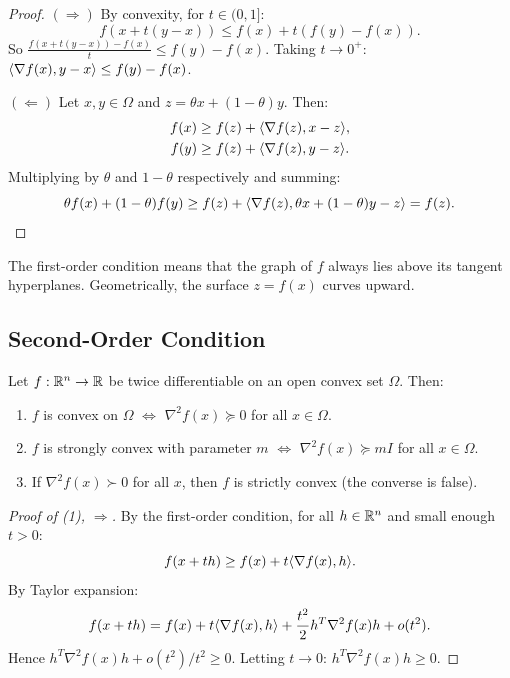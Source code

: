 \begin{proof}
$(\Rightarrow)$ By convexity, for $t \in (0,1]$:
\[
    f(x + t(y-x)) \leq f(x) + t(f(y) - f(x)).
\]
So $\frac{f(x+t(y-x)) - f(x)}{t} \leq f(y) - f(x)$. Taking $t \to 0^+$:
$\langle \nabla f(x), y-x \rangle \leq f(y) - f(x)$.

$(\Leftarrow)$ Let $x, y \in \Omega$ and $z = \theta x + (1-\theta)y$. Then:
\begin{align*}
    f(x) &\geq f(z) + \langle \nabla f(z), x - z \rangle, \\
    f(y) &\geq f(z) + \langle \nabla f(z), y - z \rangle.
\end{align*}
Multiplying by $\theta$ and $1-\theta$ respectively and summing:
\[
    \theta f(x) + (1-\theta)f(y) \geq f(z) + \langle \nabla f(z), \theta x + (1-\theta)y - z \rangle = f(z).
\]
\end{proof}

\begin{intuition}
The first-order condition means that the graph of $f$ always lies above its tangent
hyperplanes. Geometrically, the surface $z = f(x)$ curves upward.
\end{intuition}

\subsection{Second-Order Condition}

\begin{theorem}
\label{thm:second_order}
Let $f : \mathbb{R}^n \to \mathbb{R}$ be twice differentiable on an open convex set $\Omega$. Then:
\begin{enumerate}
    \item $f$ is convex on $\Omega$ $\Leftrightarrow$ $\nabla^2 f(x) \succeq 0$
          for all $x \in \Omega$.
    \item $f$ is strongly convex with parameter $m$ $\Leftrightarrow$
          $\nabla^2 f(x) \succeq mI$ for all $x \in \Omega$.
    \item If $\nabla^2 f(x) \succ 0$ for all $x$, then $f$ is strictly convex
          (the converse is false).
\end{enumerate}
\end{theorem}

\begin{proof}[Proof of (1), $\Rightarrow$]
By the first-order condition, for all $h \in \mathbb{R}^n$ and small enough $t > 0$:
\[
    f(x + th) \geq f(x) + t\langle \nabla f(x), h \rangle.
\]
By Taylor expansion:
\[
    f(x+th) = f(x) + t\langle \nabla f(x), h \rangle + \frac{t^2}{2}h^T\nabla^2 f(x)h + o(t^2).
\]
Hence $h^T\nabla^2 f(x)h + o(t^2)/t^2 \geq 0$. Letting $t \to 0$:
$h^T\nabla^2 f(x)h \geq 0$.
\end{proof}

